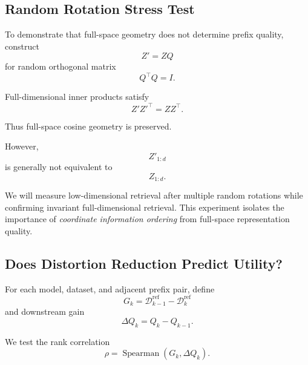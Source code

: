 \documentclass[11pt]{article}
\newcommand{\cD}{\mathcal{D}}
\begin{document}
\subsection{Random Rotation Stress Test}

To demonstrate that full-space geometry does not determine prefix quality, construct
\begin{equation}
    Z'=ZQ
\end{equation}
for random orthogonal matrix
\begin{equation}
    Q^\top Q=I.
\end{equation}

Full-dimensional inner products satisfy
\begin{equation}
    Z'Z'^\top=ZZ^\top.
\end{equation}

Thus full-space cosine geometry is preserved.

However,
\begin{equation}
    Z'_{1:d}
\end{equation}
is generally not equivalent to
\begin{equation}
    Z_{1:d}.
\end{equation}

We will measure low-dimensional retrieval after multiple random rotations while confirming invariant full-dimensional retrieval.
This experiment isolates the importance of \emph{coordinate information ordering} from full-space representation quality.


\subsection{Does Distortion Reduction Predict Utility?}

For each model, dataset, and adjacent prefix pair, define
\begin{equation}
    G_k
    =
    \cD_{k-1}^{\mathrm{ref}}
    -
    \cD_k^{\mathrm{ref}}
\end{equation}
and downstream gain
\begin{equation}
    \Delta Q_k
    =
    Q_k-Q_{k-1}.
\end{equation}

We test the rank correlation
\begin{equation}
\boxed{
    \rho
    =
    \operatorname{Spearman}
    (
        G_k,\Delta Q_k
    ).
}
\end{equation}
\end{document}
